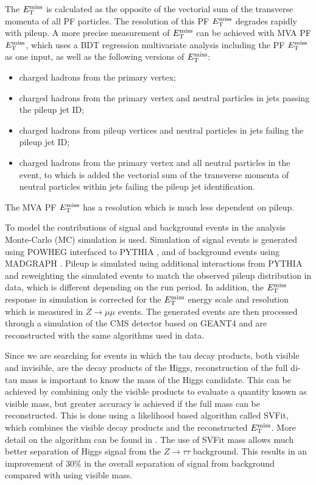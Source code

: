 The $E_{\rm{T}}^{\rm{miss}}$ is calculated as the opposite of the vectorial sum
of the transverse momenta of all PF particles. The resolution of this PF
$E_{\rm{T}}^{\rm{miss}}$ degrades rapidly with pileup. A more precise
measurement of $E_{\rm{T}}^{\rm{miss}}$ can be achieved with MVA PF
$E_{\rm{T}}^{\rm{miss}}$, which uses a BDT regression multivariate analysis
including the PF $E_{\rm{T}}^{\rm{miss}}$ as one input, as well as the following
versions of $E_{\rm{T}}^{\rm{miss}}$:
\begin{itemize}
\item charged hadrons from the primary vertex;
\item charged hadrons from the primary vertex and neutral particles in jets
passing the
pileup jet ID;
\item charged hadrons from pileup vertices and neutral particles in jets failing
the pileup jet ID;
\item charged hadrons from the primary vertex and all neutral particles in the
event, to which is added the vectorial sum of the transverse momenta of neutral
particles within jets failing the pileup jet identification.
\end{itemize}

The MVA PF $E_{\rm{T}}^{\rm{miss}}$ has a resolution which is much less
dependent on pileup.

To model the contributions of signal and background events in the analysis
Monte-Carlo (MC) simulation is used. Simulation of signal events is generated
using POWHEG \cite{powheg} interfaced to PYTHIA \cite{pythia}, and of
background events using MADGRAPH \cite{madgraph}. Pileup is simulated using
additional interactions from PYTHIA and reweighting the simulated events to
match the observed pileup distribution in data, which is different depending on
the run period. In addition, the $E_{\rm{T}}^{\rm{miss}}$ response in
simulation is corrected for the $E_{\rm{T}}^{\rm{miss}}$ energy scale and
resolution which is measured in $Z\rightarrow\mu\mu$ events. The generated
events are then processed through a simulation of the CMS detector based on
GEANT4 \cite{geant4} and are reconstructed with the same algorithms used in
data.

Since we are searching for events in which the tau decay products, both visible
and invisible, are the decay products of the Higgs, reconstruction of the full
di-tau mass is important to know the mass of the Higgs candidate. This can be
achieved by combining only the visible products to evaluate a quantity known as
visible mass, but greater accuracy is achieved if the full mass can be
reconstructed. This is done using a likelihood based algorithm called SVFit,
which combines the visible decay products and the reconstructed
$E_{\rm{T}}^{\rm{miss}}$. More detail on the algorithm can be found in
\cite{CMS-PAS-HIG-13-004}. The use of SVFit mass allows much better separation
of Higgs signal from the $Z\rightarrow\tau\tau$ background. This results in an
improvement of 30$\%$ in the overall separation of signal from background
compared with using visible mass.



